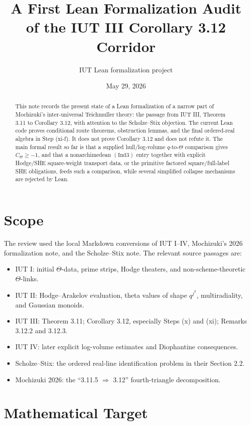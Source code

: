 \documentclass[11pt]{article}
\title{A First Lean Formalization Audit of the IUT III Corollary 3.12 Corridor}
\author{IUT Lean formalization project}
\date{May 29, 2026}
\begin{document}
\maketitle
\sloppy

\begin{abstract}
This note records the present state of a Lean formalization of a narrow part of
Mochizuki's inter-universal Teichmuller theory: the passage from IUT III,
Theorem 3.11 to Corollary 3.12, with attention to the Scholze--Stix objection.
The current Lean code proves conditional route theorems, obstruction lemmas, and
the final ordered-real algebra in Step (xi-f).  It does not prove Corollary 3.12
and does not refute it.  The main formal result so far is that a supplied
hull/log-volume \(q\)-to-\(\Theta\) comparison gives \(C_\Theta\ge-1\), and that a
nonarchimedean \((\mathrm{Ind3})\) entry together with explicit Hodge/SHE
square-weight transport data, or the primitive factored square/full-label SHE
obligations, feeds such a comparison, while several simplified collapse
mechanisms are rejected by Lean.
\end{abstract}

\section{Scope}

The review used the local Markdown conversions of IUT I--IV, Mochizuki's 2026
formalization note, and the Scholze--Stix note.  The relevant source passages are:
\begin{itemize}
\item IUT I: initial \(\Theta\)-data, prime strips, Hodge theaters, and
  non-scheme-theoretic \(\Theta\)-links.
\item IUT II: Hodge--Arakelov evaluation, theta values of shape \(q^{j^2}\),
  multiradiality, and Gaussian monoids.
\item IUT III: Theorem 3.11; Corollary 3.12, especially Steps (x) and (xi);
  Remarks 3.12.2 and 3.12.3.
\item IUT IV: later explicit log-volume estimates and Diophantine consequences.
\item Scholze--Stix: the ordered real-line identification problem in their
  Section 2.2.
\item Mochizuki 2026: the ``3.11.5 \(\Rightarrow\) 3.12'' fourth-triangle
  decomposition.
\end{itemize}

\section{Mathematical Target}
\end{document}

